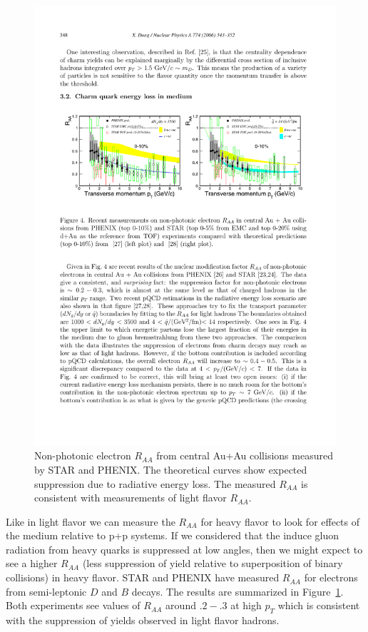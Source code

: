 \begin{figure}[htbp]
\begin{center}
\includegraphics[scale=1.8]{Plots/Intro/hf_raa.pdf}
\end{center}
\caption[NPE $R_{AA}$]{Non-photonic electron $R_{AA}$ from central Au+Au collisions measured by STAR and PHENIX. The theoretical curves show expected suppression due to radiative energy loss. The measured $R_{AA}$ is consistent with measurements of light flavor $R_{AA}$.}
\label{fig:hf_raa}
\end{figure}

Like in light flavor we can measure the $R_{AA}$ for heavy flavor to look for effects of the medium relative to p+p systems. If we considered that the induce gluon radiation from heavy quarks is suppressed at low angles, then we might expect to see a higher $R_{AA}$ (less suppression of yield relative to superposition of binary collisions) in heavy flavor. STAR and PHENIX have measured $R_{AA}$ for electrons from semi-leptonic $D$ and $B$ decays. The results are summarized in Figure~\ref{fig:hf_raa}. Both experiments see values of $R_{AA}$ around $.2-.3$ at high $p_T$ which is consistent with the suppression of yields observed in light flavor hadrons.


